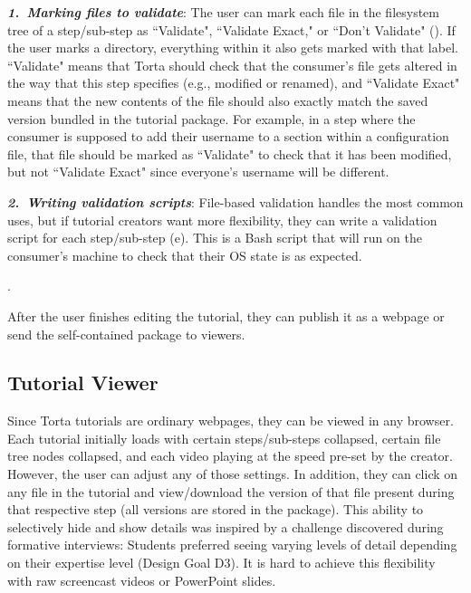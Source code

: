 \emph{\textbf{1.~Marking files to validate}}: The user can mark each
file in the filesystem tree of a step/sub-step as ``Validate",
``Validate Exact," or ``Don't Validate" (). If the user marks a directory,
everything within it also gets marked with that label. ``Validate" means
that Torta should check that the consumer's file gets altered in the way
that this step specifies (e.g., modified or renamed), and ``Validate
Exact" means that the new contents of the file should also exactly match
the saved version bundled in the tutorial package. For example, in a step where the consumer is supposed
to add their username to a section within a configuration file, that
file should be marked as ``Validate" to check that it has been modified,
but not ``Validate Exact" since everyone's username will be different.

\emph{\textbf{2.~Writing validation scripts}}: File-based validation
handles the most common uses, but if tutorial creators want more
flexibility, they can write a validation script for each
step/sub-step (e). This is a Bash script that will run on the consumer's
machine to check that their OS state is as expected.

.

After the user finishes editing the tutorial, they can publish it as a
webpage or send the self-contained package to viewers.


\subsection{Tutorial Viewer}

Since Torta tutorials are ordinary webpages, they can be viewed in any
browser. Each tutorial initially loads with certain steps/sub-steps
collapsed, certain file tree nodes collapsed, and each video playing at the
speed pre-set by the creator. However, the user can adjust any of those
settings. In addition, they can click on any file in the tutorial and
view/download the version of that file present during that respective
step (all versions are stored in the package). This ability to
selectively hide and show details was inspired by a challenge discovered
during formative interviews: Students preferred seeing varying levels of
detail depending on their expertise level (Design Goal D3). It is hard
to achieve this flexibility with raw screencast videos or PowerPoint
slides.

